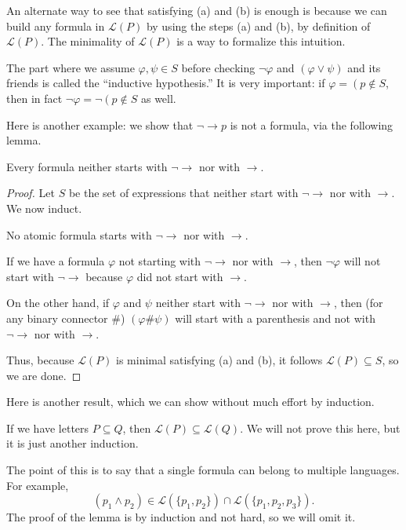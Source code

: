\documentclass[../notes.tex]{subfiles}
\begin{document}
An alternate way to see that satisfying (a) and (b) is enough is because we can build any formula in $\mathcal L(P)$ by using the steps (a) and (b), by definition of $\mathcal L(P)$. The minimality of $\mathcal L(P)$ is a way to formalize this intuition.
\begin{remark}
	The part where we assume $\varphi,\psi\in S$ before checking $\lnot\varphi$ and $(\varphi\lor\psi)$ and its friends is called the ``inductive hypothesis.'' It is very important: if $\varphi=\left(p\right.\notin S$, then in fact $\lnot\varphi=\lnot\left(p\right.\notin S$ as well.
\end{remark}
Here is another example: we show that $\lnot\to p$ is not a formula, via the following lemma.
\begin{lemma}
	Every formula neither starts with $\lnot\to$ nor with $\to$.
\end{lemma}
\begin{proof}
	Let $S$ be the set of expressions that neither start with $\lnot\to$ nor with $\to$. We now induct.
	\begin{listalph}
		\item No atomic formula starts with $\lnot\to$ nor with $\to$.
		\item If we have a formula $\varphi$ not starting with $\lnot\to$ nor with $\to$, then $\lnot\varphi$ will not start with $\lnot\to$ because $\varphi$ did not start with $\to$.

		On the other hand, if $\varphi$ and $\psi$ neither start with $\lnot\to$ nor with $\to$, then (for any binary connector $\#$) $(\varphi\#\psi)$ will start with a parenthesis and not with $\lnot\to$ nor with $\to$.
	\end{listalph}
	Thus, because $\mathcal L(P)$ is minimal satisfying (a) and (b), it follows $\mathcal L(P)\subseteq S$, so we are done.
\end{proof}
Here is another result, which we can show without much effort by induction.
\begin{lemma}
	If we have letters $P\subseteq Q$, then $\mathcal L(P)\subseteq\mathcal L(Q)$. We will not prove this here, but it is just another induction.
\end{lemma}
The point of this is to say that a single formula can belong to multiple languages. For example,
\[(p_1\land p_2)\in\mathcal L(\{p_1,p_2\})\cap\mathcal L(\{p_1,p_2,p_3\}).\]
The proof of the lemma is by induction and not hard, so we will omit it.%
\end{document}
